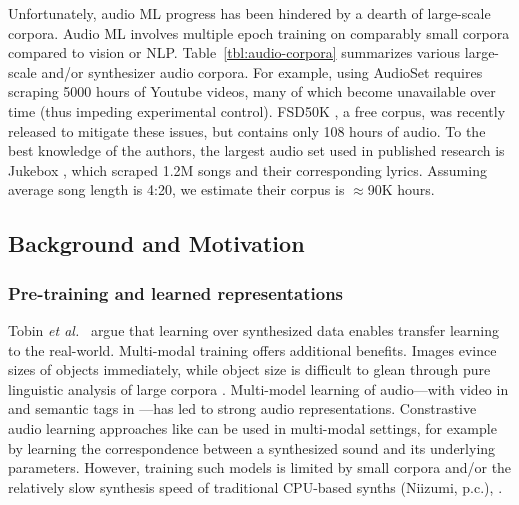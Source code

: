 Unfortunately, audio ML progress has been hindered by a dearth of large-scale corpora. Audio ML involves multiple epoch training on comparably small corpora compared to vision or NLP. Table~\ref{tbl:audio-corpora} summarizes various large-scale and/or synthesizer audio corpora.
For example, using AudioSet \cite{45857} requires scraping 5000 hours of Youtube videos, many of which become unavailable over time (thus impeding experimental control). FSD50K \cite{fonseca2020fsd50k}, a free corpus, was recently released to mitigate these issues, but contains only 108 hours of audio. To the best knowledge of the authors, the largest audio set used in published research is Jukebox \cite{dhariwal2020jukebox}, which scraped 1.2M songs and their corresponding lyrics. Assuming average song length is 4:20, we estimate their corpus is $\approx$90K hours. 

\subsection{Background and Motivation}

\subsubsection{Pre-training and learned representations}

Tobin {\em et al.}~\cite{DBLP:conf/iros/TobinFRSZA17} argue that learning over synthesized data enables transfer learning to the real-world.
Multi-modal training offers additional benefits.
Images evince sizes of objects immediately, while object size is difficult to glean through pure linguistic analysis of large corpora  \cite{DBLP:conf/acl/ElazarMRBR19}.
Multi-model learning of audio---with video in \cite{DBLP:conf/icassp/CramerWSB19} and semantic tags in \cite{drossos:icml:2020}---has led to strong audio representations.
Constrastive audio learning approaches like \cite{saeed2020contrastive} can be used in multi-modal settings, for example by learning the correspondence between a synthesized sound and its underlying parameters.
However, training such models is limited by small corpora and/or the relatively slow synthesis speed of traditional CPU-based synths (Niizumi, p.c.),  \cite{masudo2021quality}.



